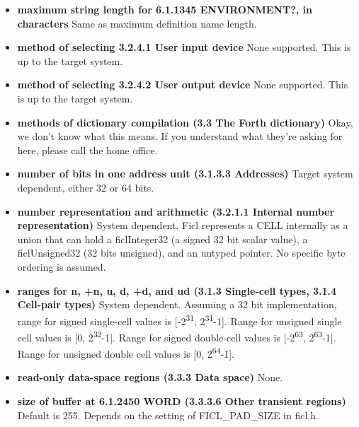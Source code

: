 \begin{itemize}[noitemsep]
	\item \textbf{maximum string length for 6.1.1345 ENVIRONMENT?,
		in characters}\newline
	Same as maximum definition name length.

	\item \textbf{method of selecting 3.2.4.1 User input
		device}\newline
	None supported. This is up to the target system.

	\item \textbf{method of selecting 3.2.4.2 User output
		device}\newline
	None supported. This is up to the target system.

	\item \textbf{methods of dictionary compilation (3.3 The Forth
		dictionary)}\newline
	Okay, we don't know what this means. If you understand what
	they're asking for here, please call the home office.

	\item \textbf{number of bits in one address unit (3.1.3.3
		Addresses)}\newline
	Target system dependent, either 32 or 64 bits.

	\item \textbf{number representation and arithmetic (3.2.1.1
		Internal number representation)}\newline
	System dependent. Ficl represents a CELL internally as a union
	that can hold a ficlInteger32 (a signed 32 bit scalar value),
	a ficlUnsigned32 (32 bits unsigned), and an untyped pointer. No
	specific byte ordering is assumed.

	\item \textbf{ranges for n, +n, u, d, +d, and ud (3.1.3
		Single-cell types, 3.1.4 Cell-pair types)}\newline
	System dependent. Assuming a 32 bit implementation, range for
	signed single-cell values is [-2\textsuperscript{31},
	2\textsuperscript{31}-1]. Range for unsigned single cell values
	is [0, 2\textsuperscript{32}-1]. Range for signed double-cell
	values is [-2\textsuperscript{63}, 2\textsuperscript{63}-1].
	Range for unsigned double cell values is [0,
	2\textsuperscript{64}-1].

	\item \textbf{read-only data-space regions (3.3.3 Data
		space)}\newline
	None.

	\item \textbf{size of buffer at 6.1.2450 WORD (3.3.3.6 Other
		transient regions)}\newline
	Default is 255. Depends on the setting of FICL\_PAD\_SIZE in
	ficl.h.


\end{itemize}
